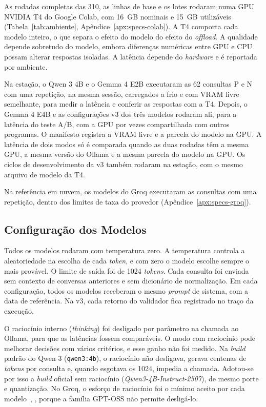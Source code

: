 As rodadas completas das 310, as linhas de base e os lotes rodaram numa GPU NVIDIA T4 do Google Colab, com 16~GB nominais e 15~GB utilizáveis (Tabela~\ref{tab:ambiente}, Apêndice~\ref{apx:specs-colab}). A T4 comporta cada modelo inteiro, o que separa o efeito do modelo do efeito do \textit{offload}. A qualidade depende sobretudo do modelo, embora diferenças numéricas entre GPU e CPU possam alterar respostas isoladas. A latência depende do \textit{hardware} e é reportada por ambiente.

Na estação, o Qwen 3 4B e o Gemma 4 E2B executaram as 62 consultas P e N com uma repetição, na mesma sessão, carregados a frio e com VRAM livre semelhante, para medir a latência e conferir as respostas com a T4. Depois, o Gemma 4 E4B e as configurações v3 dos três modelos rodaram ali, para a latência do teste A/B, com a GPU por vezes compartilhada com outros programas. O manifesto registra a VRAM livre e a parcela do modelo na GPU. A latência de dois modos só é comparada quando as duas rodadas têm a mesma GPU, a mesma versão do Ollama e a mesma parcela do modelo na GPU. Os ciclos de desenvolvimento da v3 também rodaram na estação, com o mesmo arquivo de modelo da T4.

Na referência em nuvem, os  modelos do Groq executaram as  consultas com uma repetição, dentro dos limites de taxa do provedor (Apêndice~\ref{apx:specs-groq}).

\subsection{Configuração dos Modelos}
\label{sec:config-modelos}

Todos os modelos rodaram com temperatura zero. A temperatura controla a aleatoriedade na escolha de cada \textit{token}, e com zero o modelo escolhe sempre o mais provável. O limite de saída foi de 1024 \textit{tokens}. Cada consulta foi enviada sem contexto de conversas anteriores e sem dicionário de normalização. Em cada configuração, todos os modelos receberam o mesmo \textit{prompt} de sistema, com a data de referência. Na v3, cada retorno do validador fica registrado no traço da execução.

O raciocínio interno (\textit{thinking}) foi desligado por parâmetro na chamada ao Ollama, para que as latências fossem comparáveis. O modo com raciocínio pode melhorar decisões com vários critérios, e esse ganho não foi medido. Na \textit{build} padrão do Qwen 3 (\texttt{qwen3:4b}), o raciocínio não desligava, gerava centenas de \textit{tokens} por consulta e, quando esgotava os 1024, impedia a chamada. Adotou-se por isso a \textit{build} oficial sem raciocínio (\textit{Qwen3-4B-Instruct-2507}), de mesmo porte e quantização. No Groq, o esforço de raciocínio foi o mínimo aceito por cada modelo~\cite{groq2026reasoning}, , porque a família GPT-OSS não permite desligá-lo.

